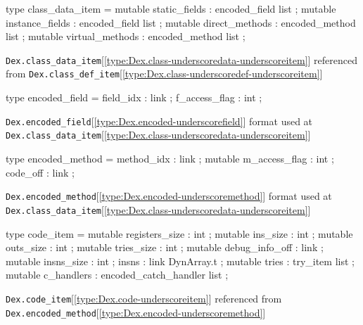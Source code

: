 \documentclass[11pt]{article}
\begin{document}
\label{type:Dex.class-underscoredata-underscoreitem}\begin{ocamldoccode}
type class_data_item = {}
  mutable static_fields : encoded_field list ;
  mutable instance_fields : encoded_field list ;
  mutable direct_methods : encoded_method list ;
  mutable virtual_methods : encoded_method list ;
{}
\end{ocamldoccode}
\begin{ocamldocdescription}
{\tt{Dex.class\_data\_item}}[\ref{type:Dex.class-underscoredata-underscoreitem}] referenced from {\tt{Dex.class\_def\_item}}[\ref{type:Dex.class-underscoredef-underscoreitem}]


\end{ocamldocdescription}




\label{type:Dex.encoded-underscorefield}\begin{ocamldoccode}
type encoded_field = {}
  field_idx : link ;
  f_access_flag : int ;
{}
\end{ocamldoccode}
\begin{ocamldocdescription}
{\tt{Dex.encoded\_field}}[\ref{type:Dex.encoded-underscorefield}] format used at {\tt{Dex.class\_data\_item}}[\ref{type:Dex.class-underscoredata-underscoreitem}]


\end{ocamldocdescription}




\label{type:Dex.encoded-underscoremethod}\begin{ocamldoccode}
type encoded_method = {}
  method_idx : link ;
  mutable m_access_flag : int ;
  code_off : link ;
{}
\end{ocamldoccode}
\begin{ocamldocdescription}
{\tt{Dex.encoded\_method}}[\ref{type:Dex.encoded-underscoremethod}] format used at {\tt{Dex.class\_data\_item}}[\ref{type:Dex.class-underscoredata-underscoreitem}]


\end{ocamldocdescription}




\label{type:Dex.code-underscoreitem}\begin{ocamldoccode}
type code_item = {}
  mutable registers_size : int ;
  mutable ins_size : int ;
  mutable outs_size : int ;
  mutable tries_size : int ;
  mutable debug_info_off : link ;
  mutable insns_size : int ;
  insns : link DynArray.t ;
  mutable tries : try_item list ;
  mutable c_handlers : encoded_catch_handler list ;
{}
\end{ocamldoccode}
\begin{ocamldocdescription}
{\tt{Dex.code\_item}}[\ref{type:Dex.code-underscoreitem}] referenced from {\tt{Dex.encoded\_method}}[\ref{type:Dex.encoded-underscoremethod}]


\end{ocamldocdescription}
\end{document}
